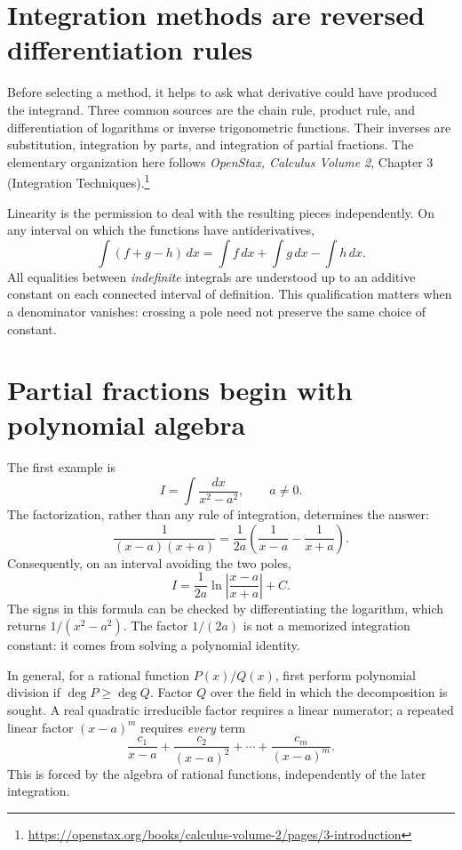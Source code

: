 
\section{Integration methods are reversed differentiation rules}

Before selecting a method, it helps to ask what derivative could have produced the integrand.  Three common sources are the chain rule, product rule, and differentiation of logarithms or inverse trigonometric functions.  Their inverses are substitution, integration by parts, and integration of partial fractions.  The elementary organization here follows \emph{OpenStax, Calculus Volume 2}, Chapter 3 (Integration Techniques).\footnote{\url{https://openstax.org/books/calculus-volume-2/pages/3-introduction}}

Linearity is the permission to deal with the resulting pieces independently. On any interval on which the functions have antiderivatives,
\[
 \int (f+g-h)\,dx=\int f\,dx+\int g\,dx-\int h\,dx.
\]
All equalities between \emph{indefinite} integrals are understood up to an additive constant on each connected interval of definition. This qualification matters when a denominator vanishes: crossing a pole need not preserve the same choice of constant.

\section{Partial fractions begin with polynomial algebra}

The first example is
\[
 I=\int\frac{dx}{x^2-a^2},\qquad a\ne0.
\]
The factorization, rather than any rule of integration, determines the answer:
\[
 \frac1{(x-a)(x+a)}
 =\frac1{2a}\left(\frac1{x-a}-\frac1{x+a}\right).
\]
Consequently, on an interval avoiding the two poles,
\[
 \boxed{I=\frac1{2a}\ln\left|\frac{x-a}{x+a}\right|+C.}
\]
The signs in this formula can be checked by differentiating the logarithm, which returns \(1/(x^2-a^2)\). The factor \(1/(2a)\) is not a memorized integration constant: it comes from solving a polynomial identity.

In general, for a rational function \(P(x)/Q(x)\), first perform polynomial division if \(\deg P\ge\deg Q\). Factor \(Q\) over the field in which the decomposition is sought. A real quadratic irreducible factor requires a linear numerator; a repeated linear factor \((x-a)^m\) requires \emph{every} term
\[
 \frac{c_1}{x-a}+\frac{c_2}{(x-a)^2}
       +\cdots+\frac{c_m}{(x-a)^m}.
\]
This is forced by the algebra of rational functions, independently of the later integration.


